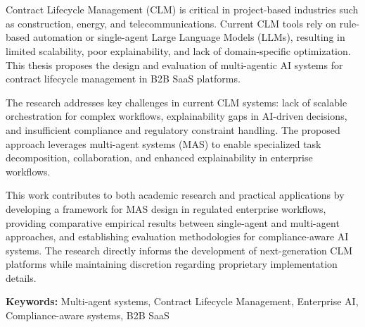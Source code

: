 \chapter{\abstractname}

Contract Lifecycle Management (CLM) is critical in project-based industries such as construction, energy, and telecommunications. Current CLM tools rely on rule-based automation or single-agent Large Language Models (LLMs), resulting in limited scalability, poor explainability, and lack of domain-specific optimization. This thesis proposes the design and evaluation of multi-agentic AI systems for contract lifecycle management in B2B SaaS platforms.

The research addresses key challenges in current CLM systems: lack of scalable orchestration for complex workflows, explainability gaps in AI-driven decisions, and insufficient compliance and regulatory constraint handling. The proposed approach leverages multi-agent systems (MAS) to enable specialized task decomposition, collaboration, and enhanced explainability in enterprise workflows.

This work contributes to both academic research and practical applications by developing a framework for MAS design in regulated enterprise workflows, providing comparative empirical results between single-agent and multi-agent approaches, and establishing evaluation methodologies for compliance-aware AI systems. The research directly informs the development of next-generation CLM platforms while maintaining discretion regarding proprietary implementation details.

\textbf{Keywords:} Multi-agent systems, Contract Lifecycle Management, Enterprise AI, Compliance-aware systems, B2B SaaS


